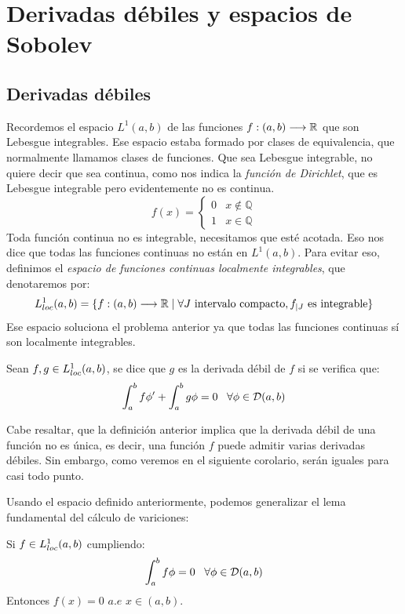 \section{Derivadas débiles y espacios de Sobolev}

\subsection{Derivadas débiles}

Recordemos el espacio $L^1(a,b)$ de las funciones $f : (a,b) \longrightarrow \mathbb{R}$ que son Lebesgue integrables. Ese espacio estaba formado por clases de equivalencia, que normalmente llamamos clases de funciones. Que sea Lebesgue integrable, no quiere decir que sea continua, como nos indica la \textit{función de Dirichlet}, que es Lebesgue integrable pero evidentemente no es continua.
\[
f(x)=\left\{
\begin{array}{cc}
0 & x\notin\mathbb{Q} \\
1 & x\in\mathbb{Q}
\end{array}
\right. 
\]
Toda función continua no es integrable, necesitamos que esté acotada. Eso nos dice que todas las funciones continuas no están en $L^1(a,b)$. Para evitar eso, definimos el \textit{espacio de funciones continuas localmente integrables}, que denotaremos por:
\[
L^1_{loc}(a,b)=\{f : (a,b) \longrightarrow \mathbb{R} \;|\; \forall J \text{ intervalo compacto},f_{|J}\text{ es integrable}\}
\]
Ese espacio soluciona el problema anterior ya que todas las funciones continuas sí son localmente integrables.

\begin{definition}
Sean $f,g\in L^1_{loc}(a,b)$, se dice que $g$ es la derivada débil de $f$ si se verifica que:
\[
\displaystyle\int_{ a }^{ b } f\phi'+\displaystyle\int_{ a }^{ b } g\phi=0 \;\;\; \forall\phi\in\mathcal{D}(a,b)
\]
\end{definition}

Cabe resaltar, que la definición anterior implica que la derivada débil de una función no es única, es decir, una función $f$ puede admitir varias derivadas débiles. Sin embargo, como veremos en el siguiente corolario, serán iguales para casi todo punto.

Usando el espacio definido anteriormente, podemos generalizar el lema fundamental del cálculo de variciones:

\begin{lemma}
Si $f\in L^1_{loc}(a,b)$ cumpliendo:
\[
\displaystyle\int_{ a }^{ b } f\phi=0 \;\;\;\forall\phi\in\mathcal{D}(a,b)
\]
Entonces $f(x)=0$ $a.e$ $x\in(a,b)$.

\end{lemma}

